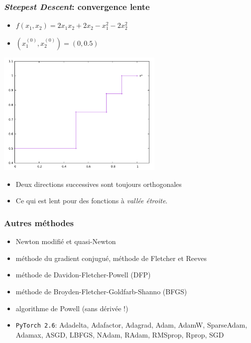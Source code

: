 \documentclass{beamer}
\begin{document}
\begin{frame}
  \frametitle{\emph{Steepest Descent}: convergence lente}

  \begin{itemize}
  \item $f(x_1,x_2) = 2x_1x_2 + 2x_2 - x_1^2 - 2x_2^2$
  \item$(x_1^{(0)}, x_2^{(0)}) = (0, 0.5)$ 
  \end{itemize}

  \begin{center}
      \includegraphics[width=0.6\textwidth]{steepest-desc}    
  \end{center}
  
  \begin{itemize}
  \item Deux directions successives sont toujours orthogonales
  \item Ce qui est lent pour des fonctions à \emph{vallée étroite}. 
  \end{itemize}
    
  
\end{frame}

\begin{frame}
  \frametitle{Autres méthodes}

  \begin{itemize}
  \item Newton modifié et quasi-Newton
  \item méthode du gradient conjugué, méthode de Fletcher et Reeves
  \item méthode de Davidon-Fletcher-Powell (DFP)
  \item méthode de Broyden-Fletcher-Goldfarb-Shanno (BFGS)
  \item algorithme de Powell (sans dérivée !)
  \item \verb!PyTorch 2.6!: Adadelta, Adafactor, Adagrad,
    Adam, AdamW, SparseAdam, Adamax, ASGD, LBFGS, NAdam,
    RAdam, RMSprop, Rprop, SGD
  \end{itemize}
  
\end{frame}
\end{document}
